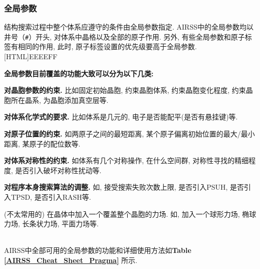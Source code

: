 \documentclass[a4paper, 10pt]{article}
\begin{document}
\subsubsection{全局参数}

结构搜索过程中整个体系应遵守的条件由全局参数指定.  AIRSS中的全局参数均以井号（\verb|#|）开头, 对体系中晶格以及全部的原子作用. 另外, 有些全局参数和原子标签有相同的作用, 此时, 原子标签设置的优先级要高于全局参数.\\

\noindent{}[HTML]{EEEEFF}{\parbox{\textwidth}{%
\noindent \textbf{全局参数目前覆盖的功能大致可以分为以下几类:}
\begin{maineu}
  \item \textbf{对晶胞参数的约束.} 比如固定初始晶胞, 约束晶胞体系, 约束晶胞变化程度, 约束晶胞所在晶系, 为晶胞添加真空层等.
  \item \textbf{对体系化学式的要求.} 比如体系是几元的, 电子是否能配平(是否有悬挂键)等.
  \item \textbf{对原子位置的约束.} 如两原子之间的最短距离, 某个原子偏离初始位置的最大/最小距离, 某原子的配位数等. 
  \item \textbf{对体系对称性的约束.} 如体系有几个对称操作, 在什么空间群, 对称性寻找的精细程度, 是否引入破坏对称性扰动等.
  \item \textbf{对程序本身搜索算法的调整.} 如, 接受搜索失败次数上限, 是否引入PSUH, 是否引入TPSD, 是否引入RASH等.
  \item (不太常用的) 在晶体中加入一个覆盖整个晶胞的力场. 如, 加入一个球形力场, 椭球力场, 长条状力场, 平面力场等.
\end{maineu}}}\\


AIRSS中全部可用的全局参数的功能和详细使用方法如\textbf{Table \ref{AIRSS_Cheat_Sheet_Pragma}} 所示.
\end{document}
